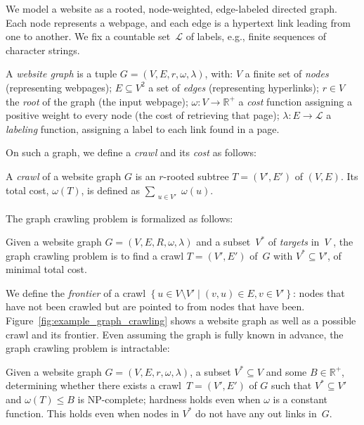 We model a website
as a rooted,
node-weighted, edge-labeled directed graph. Each node represents a webpage, and each edge is a hypertext link leading from one to another.
We fix a countable set~$\mathcal{L}$ of labels, e.g., finite sequences of
character strings.

\begin{definition}
	A \emph{website graph} is a tuple $G = (V, E, r, \omega, \lambda)$, with: $V$ a finite set of \emph{nodes}
	(representing webpages);
	$E\subseteq V^2$ a set of \emph{edges} (representing hyperlinks);
	$r \in V$ the \emph{root} of the graph (the input webpage);
	$\omega: V\to\mathbb{R}^+$ a \emph{cost} function assigning a positive
	weight to every node (the cost of	retrieving that page);
	$\lambda: E\to\mathcal{L}$ a \emph{labeling} function, assigning a label to	each link found in a page.
\end{definition}

On such a graph, we define a \emph{crawl}
and its \emph{cost} as follows:
\begin{definition}
	A \emph{crawl} of a website graph $G$
	is an $r$-rooted subtree $T=(V',E')$ of $(V,E)$.
	Its total cost, $\omega(T)$, is defined as $\sum_{\substack{u\in V'}} \omega(u)$.
\end{definition}

The graph crawling problem is formalized as follows:

\begin{problem}
\label{problem:graph-crawling}
Given a website graph $G=(V,E,R,\omega,\lambda)$ and a subset~$V^*$
of \emph{targets} in~$V$
, the graph crawling problem is to find a crawl $T=(V',E')$ of~$G$ with $V^*\subseteq V'$, of minimal total cost.
\end{problem}

We define the \emph{frontier} of a crawl $\left\{u\in V\setminus V'\mid
\left(v,u\right)\in E, v\in V'\right\}$: nodes that have not
been crawled but are pointed to from nodes that have been. Figure~\ref{fig:example_graph_crawling} shows a website graph as well as a possible crawl and its frontier. Even assuming the graph is fully known in advance, the graph crawling problem is intractable:

\begin{propositionrep}
	\label{prop:np-complete}
	Given a website graph $G=(V,E,r,\omega,\lambda)$, a subset
	$V^*\subseteq V$ and some $B\in\mathbb{R}^+$, determining
	whether there exists a crawl~$T=(V',E')$ of $G$ such that $V^*\subseteq V'$
	and $\omega(T)\leq B$ is
	NP-complete; hardness holds even when $\omega$ is a constant function.
  This holds even when nodes in $V^*$ do not have any out 
    links in~$G$.
\end{propositionrep}

